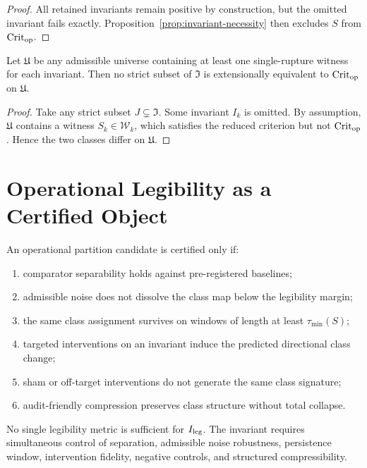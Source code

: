 \begin{proof}
All retained invariants remain positive by construction, but the omitted invariant fails exactly. Proposition~\ref{prop:invariant-necessity} then excludes $S$ from $\mathrm{Crit}_{\mathrm{op}}$.
\end{proof}

\begin{theorem}\label{thm:invariant-basis-minimality}
Let $\mathfrak{U}$ be any admissible universe containing at least one single-rupture witness for each invariant. Then no strict subset of $\mathfrak{I}$ is extensionally equivalent to $\mathrm{Crit}_{\mathrm{op}}$ on $\mathfrak{U}$.
\end{theorem}

\begin{proof}
Take any strict subset $J\subsetneq \mathfrak{I}$. Some invariant $I_k$ is omitted. By assumption, $\mathfrak{U}$ contains a witness $S_k\in \mathcal{W}_k$, which satisfies the reduced criterion but not $\mathrm{Crit}_{\mathrm{op}}$. Hence the two classes differ on $\mathfrak{U}$.
\end{proof}

\section{Operational Legibility as a Certified Object}

\begin{criterion}\label{crit:legibility}
An operational partition candidate is certified only if:
\begin{enumerate}[leftmargin=1.5em]
\item comparator separability holds against pre-registered baselines;
\item admissible noise does not dissolve the class map below the legibility margin;
\item the same class assignment survives on windows of length at least $\tau_{\min}(S)$;
\item targeted interventions on an invariant induce the predicted directional class change;
\item sham or off-target interventions do not generate the same class signature;
\item audit-friendly compression preserves class structure without total collapse.
\end{enumerate}
\end{criterion}

\begin{proposition}\label{prop:legibility}
No single legibility metric is sufficient for $I_{\mathrm{leg}}$. The invariant requires simultaneous control of separation, admissible noise robustness, persistence window, intervention fidelity, negative controls, and structured compressibility.
\end{proposition}

